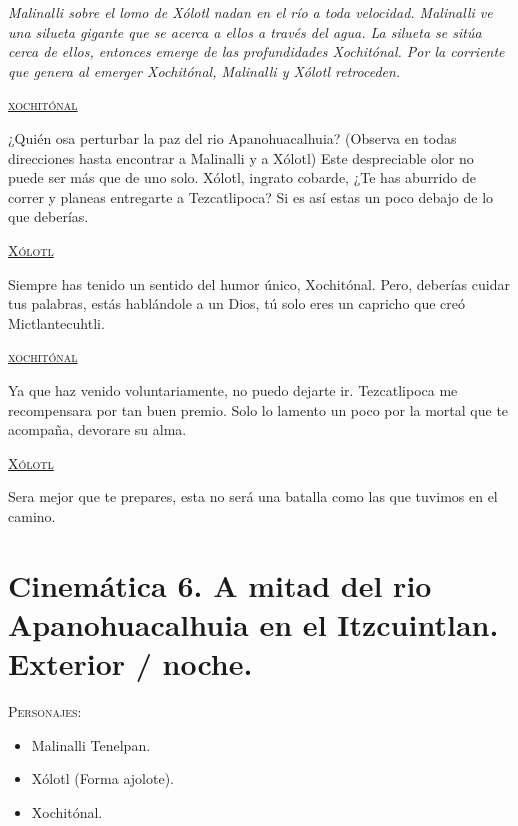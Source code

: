 \documentclass[11pt,letterpaper]{article}
\begin{document}
\textit{Malinalli sobre el lomo de Xólotl nadan en el río a toda velocidad. Malinalli ve una silueta gigante que se acerca a ellos a través del agua. La silueta se sitúa cerca de ellos, entonces emerge de las profundidades Xochitónal. Por la corriente que genera al emerger Xochitónal, Malinalli y Xólotl retroceden.}

\begin{center}
\textsc{\underline{xochitónal}}
\\
\par
¿Quién osa perturbar la paz del rio Apanohuacalhuia? (Observa en todas direcciones hasta encontrar a Malinalli y a Xólotl) Este despreciable olor no puede ser más que de uno solo. Xólotl, ingrato cobarde, ¿Te has aburrido de correr y planeas entregarte a Tezcatlipoca? Si es así estas un poco debajo de lo que deberías.
\\
\par
\textsc{\underline{Xólotl}}
\\
\par
Siempre has tenido un sentido del humor único, Xochitónal. Pero, deberías cuidar tus palabras, estás hablándole a un Dios, tú solo eres un capricho que creó Mictlantecuhtli.
\\
\par
\textsc{\underline{xochitónal}}
\\
\par
Ya que haz venido voluntariamente, no puedo dejarte ir. Tezcatlipoca me recompensara por tan buen premio. Solo lo lamento un poco por la mortal que te acompaña, devorare su alma.
\\
\par
\textsc{\underline{Xólotl}}
\\
\par
Sera mejor que te prepares, esta no será una batalla como las que tuvimos en el camino.
\end{center}

\section{Cinemática 6. A mitad del rio Apanohuacalhuia en el Itzcuintlan.  Exterior / noche.}
 \textsc{Personajes}:

\begin{itemize}
	\item Malinalli Tenelpan.
	\item Xólotl (Forma ajolote).
	\item Xochitónal.
\end{itemize}
\end{document}
